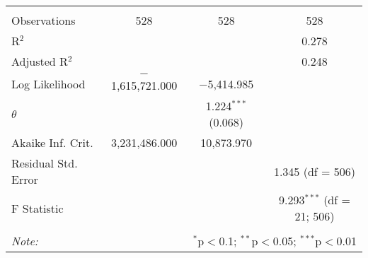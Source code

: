 \begin{table}[!htbp]
\begin{tabular}{@{\extracolsep{5pt}}lccc}
 \hline \\[-1.8ex] 
Observations & 528 & 528 & 528 \\ 
R$^{2}$ &  &  & 0.278 \\ 
Adjusted R$^{2}$ &  &  & 0.248 \\ 
Log Likelihood & $-$1,615,721.000 & $-$5,414.985 &  \\ 
$\theta$ &  & 1.224$^{***}$  (0.068) &  \\ 
Akaike Inf. Crit. & 3,231,486.000 & 10,873.970 &  \\ 
Residual Std. Error &  &  & 1.345 (df = 506) \\ 
F Statistic &  &  & 9.293$^{***}$ (df = 21; 506) \\ 
\hline 
\hline \\[-1.8ex] 
\textit{Note:}  & \multicolumn{3}{r}{$^{*}$p$<$0.1; $^{**}$p$<$0.05; $^{***}$p$<$0.01} \\ 
\end{tabular} 
\end{table} 
